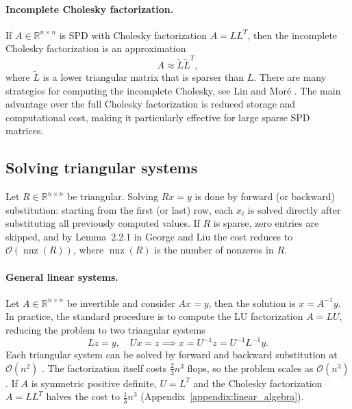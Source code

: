 \paragraph{Incomplete Cholesky factorization.} If $A \in \mathbb{R}^{n\times n}$ is SPD with Cholesky factorization $A = L L^T$, then the incomplete Cholesky factorization is an approximation
\begin{equation*}
    A \approx \tilde L \tilde L^T,
\end{equation*}
where $\tilde L$ is a lower triangular matrix that is sparser than $L$. There are many strategies for computing the incomplete Cholesky, see Lin and Moré \cite{linIncompleteCholeskyFactorizations1999}. The main advantage over the full Cholesky factorization is reduced storage and computational cost, making it particularly effective for large sparse SPD matrices.


\subsection{Solving triangular systems}\label{appendix:triangular}
Let $R \in \mathbb{R}^{n \times n}$ be triangular. Solving $R x = y$ is done by forward (or backward) substitution: starting from the first (or last) row, each $x_i$ is solved directly after substituting all previously computed values. If $R$ is sparse, zero entries are skipped, and by Lemma~2.2.1 in George and Liu \cite{georgeComputerSolutionLarge1984} the cost reduces to $\mathcal{O}(\operatorname{nnz}(R))$, where $\operatorname{nnz}(R)$ is the number of nonzeros in $R$.


\paragraph{General linear systems.} Let $A \in \mathbb{R}^{n\times n}$ be invertible and consider $A x = y$, then the solution is $x = A^{-1} y$. In practice, the standard procedure is to compute the LU factorization $A = LU$, reducing the problem to two triangular systems
\begin{equation*}
    L z = y, \quad U x = z \implies x = U^{-1} z = U^{-1} L^{-1} y.
\end{equation*}
Each triangular system can be solved by forward and backward substitution at $\mathcal{O}(n^2)$ \cite{golubMatrixComputations4th2013}. The factorization itself costs $\tfrac{2}{3}n^3$ flops, so the problem scales as $\mathcal{O}(n^3)$. If $A$ is symmetric positive definite, $U = L^T$ and the Cholesky factorization $A = LL^T$ halves the cost to $\tfrac{1}{3}n^3$ (Appendix~\ref{appendix:linear_algebra}).


